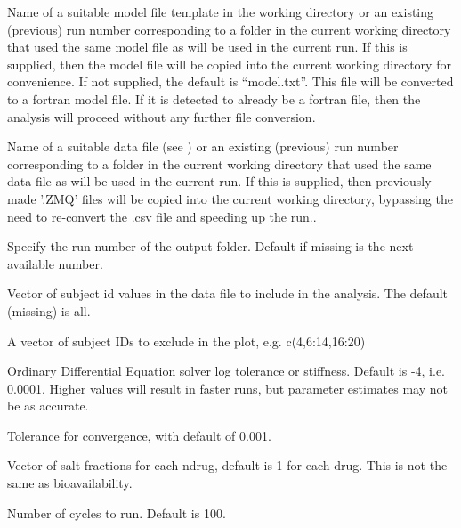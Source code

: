 \documentclass[a4paper]{book}
\begin{document}
\begin{Arguments}
\begin{ldescription}
\item[\code{model}] Name of a suitable model file template in the working directory or
an existing (previous) run number corresponding to a folder in the current working directory that used the same model file as will be used in the current run.
If this is supplied, then the model file will be copied into the current 
working directory for convenience.  If not supplied, 
the default is ``model.txt''.  This file will be converted to a fortran model file.
If it is detected to already be a fortran file, then the analysis will proceed without any further
file conversion.

\item[\code{data}] Name of a suitable data file (see ) or
an existing (previous) run number corresponding to a folder in the current working directory that used the same data file as will be used in the current run.
If this is supplied, then previously made  '.ZMQ' files will be copied into the current 
working directory, bypassing the need to re-convert the .csv file and speeding up the run..

\item[\code{run}] Specify the run number of the output folder.  Default if missing is the next available number.

\item[\code{include}] Vector of subject id values in the data file to include in the analysis.  The default (missing) is all.

\item[\code{exclude}] A vector of subject IDs to exclude in the plot, e.g. c(4,6:14,16:20)

\item[\code{ode}] Ordinary Differential Equation solver log tolerance or stiffness.  Default is -4, i.e. 0.0001.  Higher values will result in faster
runs, but parameter estimates may not be as accurate.

\item[\code{tol}] Tolerance for convergence, with default of 0.001.

\item[\code{salt}] Vector of salt fractions for each ndrug, default is 1 for each drug.  This is not the same as bioavailability.

\item[\code{cycles}] Number of cycles to run. Default is 100.


\end{ldescription}
\end{Arguments}
\end{document}

